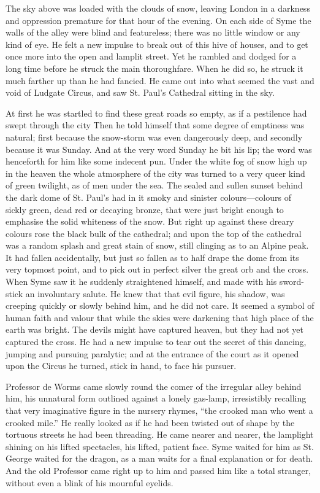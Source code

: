 \documentclass{book}
\begin{document}
The sky above was loaded with the clouds of snow, leaving London in a darkness and oppression premature for that hour of the evening. On each side of Syme the walls of the alley were blind and featureless; there was no little window or any kind of eye. He felt a new impulse to break out of this hive of houses, and to get once more into the open and lamplit street. Yet he rambled and dodged for a long time before he struck the main thoroughfare. When he did so, he struck it much farther up than he had fancied. He came out into what seemed the vast and void of Ludgate Circus, and saw St. Paul’s Cathedral sitting in the sky.

At first he was startled to find these great roads so empty, as if a pestilence had swept through the city Then he told himself that some degree of emptiness was natural; first because the snow-storm was even dangerously deep, and secondly because it was Sunday. And at the very word Sunday he bit his lip; the word was henceforth for him like some indecent pun. Under the white fog of snow high up in the heaven the whole atmosphere of the city was turned to a very queer kind of green twilight, as of men under the sea. The sealed and sullen sunset behind the dark dome of St. Paul’s had in it smoky and sinister colours—colours of sickly green, dead red or decaying bronze, that were just bright enough to emphasise the solid whiteness of the snow. But right up against these dreary colours rose the black bulk of the cathedral; and upon the top of the cathedral was a random splash and great stain of snow, still clinging as to an Alpine peak. It had fallen accidentally, but just so fallen as to half drape the dome from its very topmost point, and to pick out in perfect silver the great orb and the cross. When Syme saw it he suddenly straightened himself, and made with his sword-stick an involuntary salute. He knew that that evil figure, his shadow, was creeping quickly or slowly behind him, and he did not care. It seemed a symbol of human faith and valour that while the skies were darkening that high place of the earth was bright. The devils might have captured heaven, but they had not yet captured the cross. He had a new impulse to tear out the secret of this dancing, jumping and pursuing paralytic; and at the entrance of the court as it opened upon the Circus he turned, stick in hand, to face his pursuer.

Professor de Worms came slowly round the comer of the irregular alley behind him, his unnatural form outlined against a lonely gas-lamp, irresistibly recalling that very imaginative figure in the nursery rhymes, “the crooked man who went a crooked mile.” He really looked as if he had been twisted out of shape by the tortuous streets he had been threading. He came nearer and nearer, the lamplight shining on his lifted spectacles, his lifted, patient face. Syme waited for him as St. George waited for the dragon, as a man waits for a final explanation or for death. And the old Professor came right up to him and passed him like a total stranger, without even a blink of his mournful eyelids.
\end{document}
